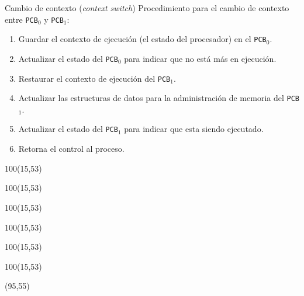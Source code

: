 \documentclass[aspectratio=169]{beamer}
\begin{document}
\begin{frame}[t]{Cambio de contexto (\emph{context switch})}
    Procedimiento para el cambio de contexto entre \texttt{PCB$_\text{0}$} y \texttt{PCB$_\text{1}$}:\\
    \vspace{0.2cm}
    \begin{enumerate}
    \small
    \setlength\itemsep{0.1cm}
    \item<3-> Guardar el contexto de ejecución (el estado del procesador) en el \texttt{PCB$_\text{0}$}.
    \item<4-> Actualizar el estado del \texttt{PCB$_\text{0}$} para indicar que no está más en ejecución.
    \item<5-> Restaurar el contexto de ejecución del \texttt{PCB$_\text{1}$}.
    \item<6-> Actualizar las estructuras de datos para la administración de memoria del \texttt{PCB$_\text{1}$}.
    \item<7-> Actualizar el estado del \texttt{PCB$_\text{1}$} para indicar que esta siendo ejecutado.
    \item<8-> Retorna el control al proceso.
    \end{enumerate}
    \begin{textblock}{100}(15,53)  \end{textblock} %
    \begin{textblock}{100}(15,53)  \end{textblock} %
    \begin{textblock}{100}(15,53)  \end{textblock} %
    \begin{textblock}{100}(15,53)  \end{textblock} %
    \begin{textblock}{100}(15,53)  \end{textblock} %
    \begin{textblock}{100}(15,53)  \end{textblock} %
    \begin{textblock}{60}(95,55)
    \end{textblock}
\end{frame}
\end{document}
